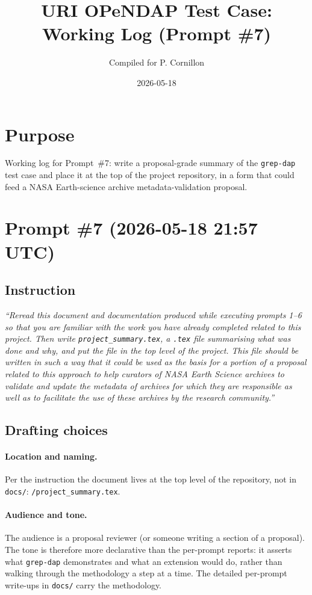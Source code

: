 \documentclass[11pt]{article}
\title{URI OPeNDAP Test Case: Working Log (Prompt \#7)}
\author{Compiled for P. Cornillon}
\date{2026-05-18}
\begin{document}
\maketitle

\section*{Purpose}

Working log for Prompt~\#7: write a proposal-grade summary of the
\texttt{grep-dap} test case and place it at the top of the project
repository, in a form that could feed a NASA Earth-science archive
metadata-validation proposal.

\section{Prompt \#7 (2026-05-18 21:57 UTC)}

\subsection{Instruction}

\emph{``Reread this document and documentation produced while
executing prompts 1--6 so that you are familiar with the work you
have already completed related to this project. Then write
\texttt{project\_summary.tex}, a \texttt{.tex} file summarising
what was done and why, and put the file in the top level of the
project. This file should be written in such a way that it could
be used as the basis for a portion of a proposal related to this
approach to help curators of NASA Earth Science archives to
validate and update the metadata of archives for which they are
responsible as well as to facilitate the use of these archives by
the research community.''}

\subsection{Drafting choices}

\paragraph{Location and naming.} Per the instruction the document
lives at the top level of the repository, not in
\texttt{docs/}: \texttt{/project\_summary.tex}.

\paragraph{Audience and tone.} The audience is a proposal
reviewer (or someone writing a section of a proposal). The tone
is therefore more declarative than the per-prompt reports: it
asserts what \texttt{grep-dap} demonstrates and what an extension
would do, rather than walking through the methodology a step at a
time. The detailed per-prompt write-ups in \texttt{docs/} carry
the methodology.
\end{document}
